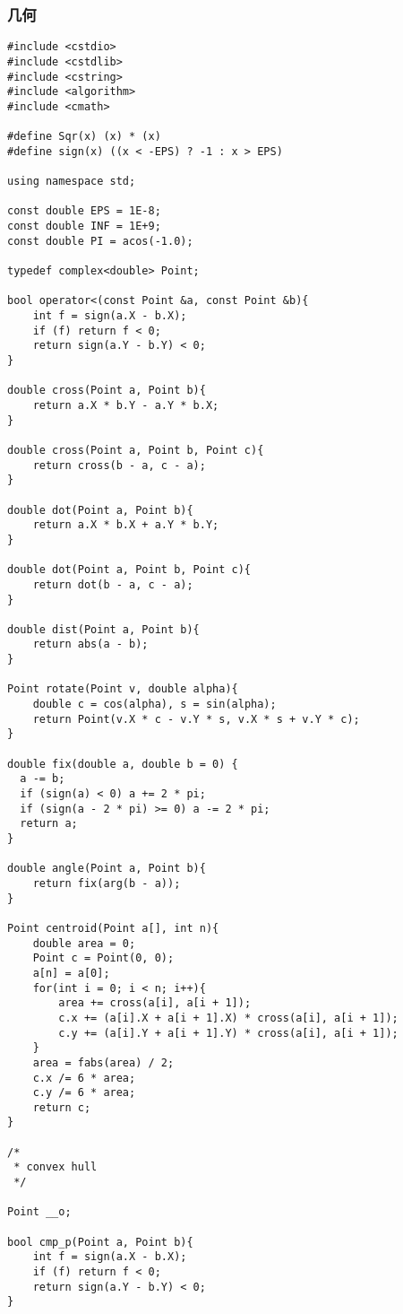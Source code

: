 \subsubsection{几何}
\begin{verbatim}
#include <cstdio>
#include <cstdlib>
#include <cstring>
#include <algorithm>
#include <cmath>

#define Sqr(x) (x) * (x)
#define sign(x) ((x < -EPS) ? -1 : x > EPS)

using namespace std;

const double EPS = 1E-8;
const double INF = 1E+9;
const double PI = acos(-1.0);

typedef complex<double> Point;

bool operator<(const Point &a, const Point &b){
    int f = sign(a.X - b.X);
    if (f) return f < 0;
    return sign(a.Y - b.Y) < 0;
}

double cross(Point a, Point b){
    return a.X * b.Y - a.Y * b.X;
}

double cross(Point a, Point b, Point c){
    return cross(b - a, c - a);
}

double dot(Point a, Point b){
    return a.X * b.X + a.Y * b.Y;
}

double dot(Point a, Point b, Point c){
    return dot(b - a, c - a);
}

double dist(Point a, Point b){
    return abs(a - b);
}

Point rotate(Point v, double alpha){
    double c = cos(alpha), s = sin(alpha);
    return Point(v.X * c - v.Y * s, v.X * s + v.Y * c);
}

double fix(double a, double b = 0) {
  a -= b;
  if (sign(a) < 0) a += 2 * pi;
  if (sign(a - 2 * pi) >= 0) a -= 2 * pi;
  return a;
}

double angle(Point a, Point b){
    return fix(arg(b - a));
}

Point centroid(Point a[], int n){
    double area = 0;
    Point c = Point(0, 0);
    a[n] = a[0];
    for(int i = 0; i < n; i++){
        area += cross(a[i], a[i + 1]);
        c.x += (a[i].X + a[i + 1].X) * cross(a[i], a[i + 1]);
        c.y += (a[i].Y + a[i + 1].Y) * cross(a[i], a[i + 1]);
    }
    area = fabs(area) / 2;
    c.x /= 6 * area;
    c.y /= 6 * area;
    return c;
}

/*
 * convex hull
 */

Point __o;

bool cmp_p(Point a, Point b){
    int f = sign(a.X - b.X);
    if (f) return f < 0;
    return sign(a.Y - b.Y) < 0;
}


\end{verbatim}
